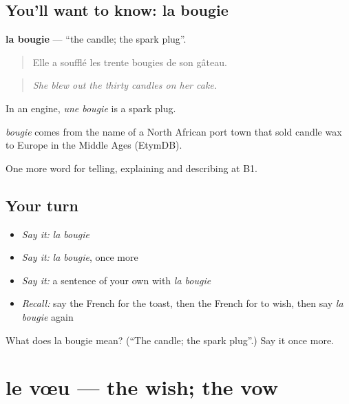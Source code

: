 \subsection*{You'll want to know: la bougie}
\textbf{la bougie} — \textquotedblleft{}the candle; the spark plug\textquotedblright{}.

\begin{quote}
Elle a soufflé les trente bougies de son gâteau.
\end{quote}

\begin{quote}
\emph{She blew out the thirty candles on her cake.}
\end{quote}

In an engine, \emph{une bougie} is a spark plug.

\begin{cousinweb}
\emph{bougie} comes from the name of a North African port town that sold candle wax to Europe in the Middle Ages (EtymDB).
\end{cousinweb}

\begin{grammarlens}[title={What you've built}]
One more word for telling, explaining and describing at B1.
\end{grammarlens}

\subsection*{Your turn}
\begin{itemize}
\raggedright
  \item \emph{Say it:} \emph{la bougie}
  \item \emph{Say it:} \emph{la bougie}, once more
  \item \emph{Say it:} a sentence of your own with \emph{la bougie}
  \item \emph{Recall:} say the French for the toast, then the French for to wish, then say \emph{la bougie} again
\end{itemize}

\begin{tcolorbox}[breakable,colback=teal!4,colframe=teal!35!black,title={Before you move on}]
What does la bougie mean? (\textquotedblleft{}The candle; the spark plug\textquotedblright{}.) Say it once more.
\end{tcolorbox}
\section[le vœu]{le vœu — the wish; the vow}

